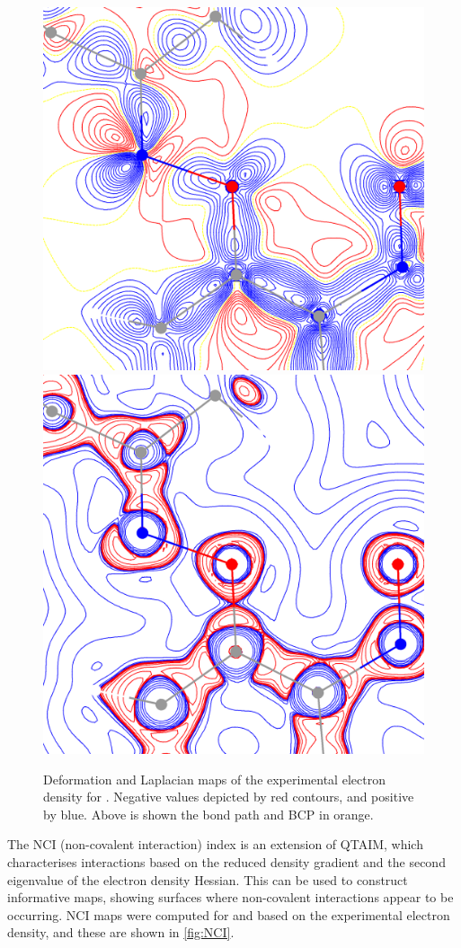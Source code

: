 \begin{refsection}
\begin{figure}
	\includegraphics[width=0.45\columnwidth]{Figures/cyclohexanone-oxime-dnp-defdens.pdf}
	\includegraphics[width=0.45\columnwidth]{Figures/cyclohexanone-oxime-dnp-lapl.pdf}
	\caption[Deformation and Laplacian maps of the electron density for .]{Deformation and Laplacian maps of the experimental electron density for . Negative values depicted by red contours, and positive by blue. Above is shown the bond path and BCP in orange.}\label{fig:lapl}
\end{figure}

The NCI (non-covalent interaction) index is an extension of QTAIM, which characterises interactions based on the reduced density gradient and the second eigenvalue of the electron density Hessian.\autocite{Johnson2010a}
This can be used to construct informative maps, showing surfaces where non-covalent interactions appear to be occurring.
NCI maps were computed for  and  based on the experimental electron density, and these are shown in \cref{fig:NCI}.


\end{refsection}
